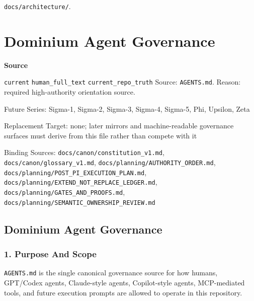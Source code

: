 \documentclass[9pt,a4paper,openany]{book}
\newcommand{\vonecallout}[3]{\par\medskip\noindent\begingroup\setlength{\fboxsep}{7pt}\colorbox{DomCalloutBg}{\parbox{0.94\linewidth}{\textbf{\textcolor{#1}{#2}}\par #3}}\endgroup\par\medskip}
\begin{document}
\texttt{docs/\allowbreak{}architecture/\allowbreak{}}.\allowbreak{}




\section{Dominium Agent Governance}

\vonecallout{DomSlate}{Source}{\texttt{current} \texttt{human\_\allowbreak{}full\_\allowbreak{}text} \texttt{current\_\allowbreak{}repo\_\allowbreak{}truth} Source: \texttt{AGENTS.\allowbreak{}md}.\allowbreak{} Reason: required high-\allowbreak{}authority orientation source.\allowbreak{}}

Future Series: Sigma-\allowbreak{}1, Sigma-\allowbreak{}2, Sigma-\allowbreak{}3, Sigma-\allowbreak{}4, Sigma-\allowbreak{}5, Phi, Upsilon, Zeta

Replacement Target: none; later mirrors and machine-\allowbreak{}readable governance surfaces must derive from this file rather than compete with it

Binding Sources: \texttt{docs/\allowbreak{}canon/\allowbreak{}constitution\_\allowbreak{}v1.\allowbreak{}md}, \texttt{docs/\allowbreak{}canon/\allowbreak{}glossary\_\allowbreak{}v1.\allowbreak{}md}, \texttt{docs/\allowbreak{}planning/\allowbreak{}AUTHORITY\_\allowbreak{}ORDER.\allowbreak{}md}, \texttt{docs/\allowbreak{}planning/\allowbreak{}POST\_\allowbreak{}PI\_\allowbreak{}EXECUTION\_\allowbreak{}PLAN.\allowbreak{}md}, \texttt{docs/\allowbreak{}planning/\allowbreak{}EXTEND\_\allowbreak{}NOT\_\allowbreak{}REPLACE\_\allowbreak{}LEDGER.\allowbreak{}md}, \texttt{docs/\allowbreak{}planning/\allowbreak{}GATES\_\allowbreak{}AND\_\allowbreak{}PROOFS.\allowbreak{}md}, \texttt{docs/\allowbreak{}planning/\allowbreak{}SEMANTIC\_\allowbreak{}OWNERSHIP\_\allowbreak{}REVIEW.\allowbreak{}md}


\subsection{Dominium Agent Governance}

\subsubsection{1. Purpose And Scope}

\texttt{AGENTS.\allowbreak{}md} is the single canonical governance source for how humans, GPT/\allowbreak{}Codex agents, Claude-\allowbreak{}style agents, Copilot-\allowbreak{}style agents, MCP-\allowbreak{}mediated tools, and future execution prompts are allowed to operate in this repository.\allowbreak{}
\end{document}
